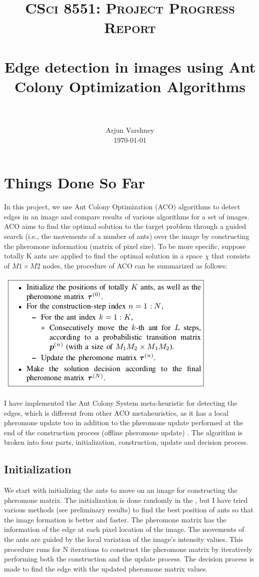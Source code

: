 \documentclass[paper=a4, fontsize=11pt]{scrartcl}
\title{
		\usefont{OT1}{cmr}{b}{n}
		\normalsize \textsc{CSci 8551: Project Progress Report} \\ [30pt]
		\horrule{0.5pt} \\[0.4cm]
		\huge Edge detection in images using Ant Colony Optimization Algorithms \\
		\horrule{2pt} \\[0.5cm]
}
\author{
		\normalfont 								\normalsize
        Arjun Varshney\\[-3pt]		\normalsize
        \today
}
\date{}
\numberwithin{equation}{section}		%
\numberwithin{figure}{section}			%
\numberwithin{table}{section}				%
\begin{document}
\maketitle
\section{Things Done So Far}
In this project, we use Ant Colony Optimization (ACO) algorithms \cite{JTWYSX} to detect edges in an image and compare results of various algorithms for a set of images. ACO aims to find the optimal solution to the target problem through a guided search (i.e., the movements of a number of ants) over the image by constructing the pheromone information (matrix of pixel size). To be more specific, suppose totally K ants are applied to find the optimal solution in a space $\chi$ that consists of $M1 \times M2$ nodes, the procedure of ACO can be summarized as follows:

\begin{center}
\includegraphics[scale=0.6]{Selection_003.png}
\end{center}

I have implemented the Ant Colony System meta-heuristic for detecting the edges, which is different from other ACO metaheuristics, as it has a local pheromone update too in addition to the pheromone update performed at the end of the construction process (offline pheromone update)\cite{JTWYSX} . The algorithm is broken into four parts, initialization, construction, update and decision process.
 
\subsection{Initialization}
We start with initializing the ants to move on an image for constructing the pheromone matrix. The initialization is done randomly in the \cite{MDKS}, but I have tried various methods (see preliminary results) to find the best position of ants so that the image formation is  better and faster. The pheromone matrix has the information of the edge at each pixel location of the image. The movements of the ants are guided by the local variation of the image's intensity values. This procedure runs for N iterations to construct the pheromone matrix by iteratively performing both the construction and the update process. The decision process is made to find the edge with the updated pheromone matrix values.
\end{document}
